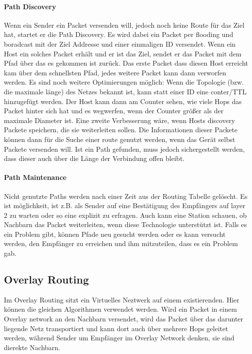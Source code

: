 			\paragraph{Path Discovery}
				Wenn ein Sender ein Packet versenden will, jedoch noch keine Route für das Ziel hat, startet er die Path Discovery. Es wird dabei ein Packet per flooding und boradcast mit der Ziel Addresse und einer einmaligen ID versendet. Wenn ein Host ein solches Packet erhält und er ist das Ziel, sendet er das Packet mit dem Pfad über das es gekommen ist zurück. Das erste Packet dass diesen Host erreicht kam über dem schnellsten Pfad, jedes weitere Packet kann dann verworfen werden. 
				Es sind noch weitere Optimierungen möglich: 
				Wenn die Topologie (bzw. die maximale länge) des Netzes bekannt ist, kann statt einer ID eine conter/TTL hinzugefügt werden. Der Host kann dann am Counter sehen, wie viele Hops das Packet hinter sich hat und es wegwerfen, wenn der Counter größer als der maximale Diameter ist. Eine zweite Verbesserung wäre, wenn Hosts discovery Packete speichern, die sie weiterleiten sollen. Die Informationen dieser Packete können dann für die Suche einer route genutzt werden, wenn das Gerät selbst Packete versenden will. Ist ein Path gefunden, muss jedoch sichergestellt werden, dass dieser auch über die Länge der Verbindung offen bleibt. 
			\paragraph{Path Maintenance}
				Nicht genutzte Paths werden nach einer Zeit aus der Routing Tabelle gelöscht. Es ist möglichkeit, ist z.B. als Sender auf eine Bestätigung des Empfängers auf layer 2 zu warten oder so eine explizit zu erfragen. Auch kann eine Station schauen, ob Nachbarn das Packet weiterleiten, wenn diese Technologie unterstützt ist. Falls es ein Problem gibt, können Pfade neu gesucht werden oder es kann versucht werden, den Empfänger zu erreichen und ihm mitzuteilen, dass es ein Problem gab.
	
	\subsection{Overlay Routing}
		Im Overlay Routing sitzt ein Virtuelles Neztwerk auf einem existierenden. Hier können die gleichen Algorithmen verwendet werden. Wird ein Packet in einem Overlay network an den Nachbarn versendet, wird das Packet über das darunter liegende Netz transportiert und kann dort auch über mehrere Hops geleitet werden, während Sender um Empfänger im Overlay Network denken, sie sind dierekte Nachbarn. 